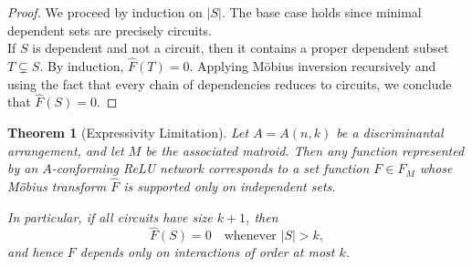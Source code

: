 \documentclass{amsart}
\newtheorem{theorem}{Theorem}[section]
\theoremstyle{definition}
\begin{document}
\begin{proof}
We proceed by induction on $|S|$. The base case holds since minimal dependent sets are precisely circuits.\\
\noindent
If $S$ is dependent and not a circuit, then it contains a proper dependent subset $T \subsetneq S$. By induction, $\widehat{F}(T)=0$. Applying Möbius inversion recursively and using the fact that every chain of dependencies reduces to circuits, we conclude that $\widehat{F}(S)=0$.
\end{proof}
\begin{theorem}[Expressivity Limitation]\label{thm:EL}
Let $A = A(n,k)$ be a discriminantal arrangement, and let $M$ be the associated matroid.
Then any function represented by an $A$-conforming ReLU network corresponds to a set function
$F \in F_M$ whose Möbius transform $\widehat{F}$ is supported only on independent sets.

In particular, if all circuits have size $k+1$, then
\[
\widehat{F}(S) = 0 \quad \text{whenever } |S| > k,
\]
and hence $F$ depends only on interactions of order at most $k$.
\end{theorem}
\end{document}
